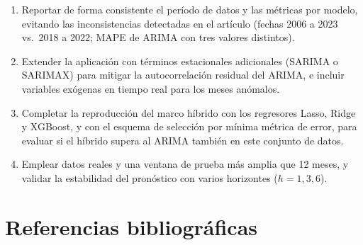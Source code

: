 \begin{enumerate}
  \item Reportar de forma consistente el período de datos y las métricas por modelo, evitando las inconsistencias detectadas en el artículo (fechas 2006 a 2023 vs.\ 2018 a 2022; MAPE de ARIMA con tres valores distintos).
  \item Extender la aplicación con términos estacionales adicionales (SARIMA o SARIMAX) para mitigar la autocorrelación residual del ARIMA, e incluir variables exógenas en tiempo real para los meses anómalos.
  \item Completar la reproducción del marco híbrido con los regresores Lasso, Ridge y XGBoost, y con el esquema de selección por mínima métrica de error, para evaluar si el híbrido supera al ARIMA también en este conjunto de datos.
  \item Emplear datos reales y una ventana de prueba más amplia que 12 meses, y validar la estabilidad del pronóstico con varios horizontes ($h=1, 3, 6$).
\end{enumerate}

\section*{Referencias bibliográficas}

\nocite{*}


